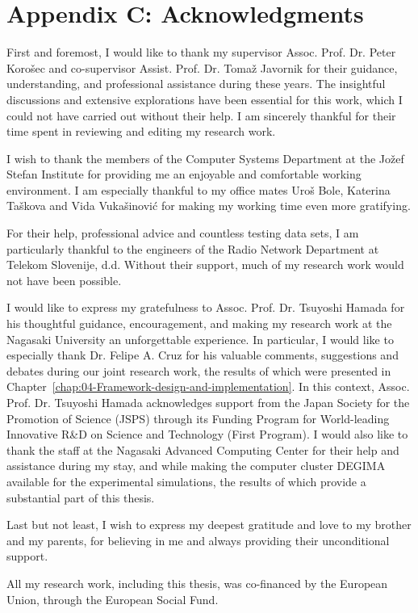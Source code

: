 
\chapter*{{\Large{\vspace{-2.3cm}Appendix C: Acknowledgments}}}

\noindent \fancyhead{}
\fancyfoot{} 
\fancyhead[RO]{\footnotesize \thepage}
\fancyhead[LE]{\footnotesize \thepage}

\noindent %

\noindent First and foremost, I would like to thank my supervisor
Assoc. Prof. Dr. Peter Koro\v{s}ec and co-supervisor Assist. Prof.
Dr. Toma\v{z} Javornik for their guidance, understanding, and professional
assistance during these years. The insightful discussions and extensive
explorations have been essential for this work, which I could not
have carried out without their help. I am sincerely thankful for their
time spent in reviewing and editing my research work.

I wish to thank the members of the Computer Systems Department at
the Jo\v{z}ef Stefan Institute for providing me an enjoyable and
comfortable working environment. I am especially thankful to my office
mates Uro\v{s} Bole, Katerina Ta\v{s}kova and Vida Vuka\v{s}inovi\'{c}
for making my working time even more gratifying.

For their help, professional advice and countless testing data sets,
I am particularly thankful to the engineers of the Radio Network Department
at Telekom Slovenije, d.d. Without their support, much of my research
work would not have been possible.

I would like to express my gratefulness to Assoc. Prof. Dr. Tsuyoshi
Hamada for his thoughtful guidance, encouragement, and making my research
work at the Nagasaki University an unforgettable experience. In particular,
I would like to especially thank Dr. Felipe A. Cruz for his valuable
comments, suggestions and debates during our joint research work,
the results of which were presented in Chapter~\ref{chap:04-Framework-design-and-implementation}.
In this context, Assoc. Prof. Dr. Tsuyoshi Hamada acknowledges support
from the Japan Society for the Promotion of Science (JSPS) through
its Funding Program for World-leading Innovative R\&D on Science and
Technology (First Program). I would also like to thank the staff at
the Nagasaki Advanced Computing Center for their help and assistance
during my stay, and while making the computer cluster DEGIMA available
for the experimental simulations, the results of which provide a substantial
part of this thesis.

\bigskip{}


Last but not least, I wish to express my deepest gratitude and love
to my brother and my parents, for believing in me and always providing
their unconditional support.

\bigskip{}


All my research work, including this thesis, was co-financed by the
European Union, through the European Social Fund.
